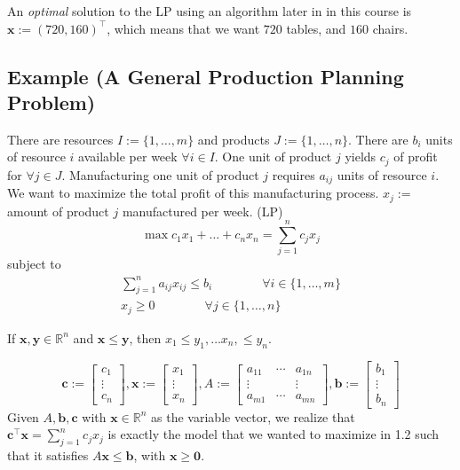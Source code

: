 An \emph{optimal} solution to the LP using an algorithm later in
in this course is $ \bm{x}:=(720,160)^\top $, which means
that we want $ 720 $ tables, and $ 160 $ chairs.

\subsection{Example (A General Production Planning Problem)}
There are resources $I:=\{1,\dots,m\}$ and products $J:=\{1,\dots,n\}$. 
There are $b_i$ units of resource
$i$ available per week $\forall i\in I$. One unit of product $j$ yields $c_j$ of profit for
$\forall j\in J$. Manufacturing one unit of product $j$ requires $a_{ij}$ units of resource $i$.
We want to maximize the total profit of this manufacturing process.
$x_j :=$ amount of product $j$ manufactured per week. (LP)
\[\max c_1x_1 + \dots + c_nx_n = \sum\limits_{j=1}^n c_jx_j\]
subject to
\begin{align*}
    \sum\limits_{j=1}^n a_{ij}x_{ij}\le b_i \qquad\qquad\forall i\in\{1,\dots,m\}\\
    x_{j}\ge 0 \qquad\qquad\forall j\in\{1,\dots,n\}
\end{align*}

\begin{remark}
    If $\bm{x},\bm{y}\in\mathbb{R}^n$ and $\bm{x}\le \bm{y}$, then
    $x_1\le y_1, \dots x_n, \le y_n$.
\end{remark}

\begin{remark}
\[
\bm{c}:=\left[\begin{array}{c}{c_{1}} \\ {\vdots} \\ {c_{n}}\end{array}\right],
\bm{x}:=\left[\begin{array}{c}{x_{1}} \\ {\vdots} \\ {x_{n}}\end{array}\right],
A:=\left[\begin{array}{cccc}
    {a_{11}} & \cdots & {a_{1 n}} \\
    \vdots & & \vdots \\
     {a_{m 1}} & \cdots & {a_{m n}}
    \end{array}\right],
\bm{b}:=\left[\begin{array}{c}{b_{1}} \\ {\vdots} \\ {b_{n}}\end{array}\right]
\]
Given $A,\bm{b},\bm{c}$ with $\bm{x}\in\mathbb{R}^n$ as the variable vector, we realize that
$\bm{c}^\top  \bm{x}=\sum\limits_{j=1}^n c_jx_j$ is exactly the model that we wanted to maximize
in 1.2 such that it satisfies $A\bm{x}\le \bm{b}$, with $\bm{x}\ge \bm{0}$.
\end{remark}

